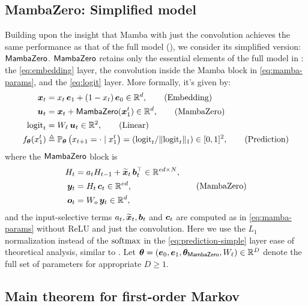 \subsection{MambaZero: Simplified model}
\label{sec:mambazero}
Building upon the insight that Mamba with just the convolution achieves the same performance as that of the full model (), we consider its simplified version: $\mathsf{MambaZero}$.  $\mathsf{MambaZero}$ retains only the essential elements of the full model in : the \ref{eq:embedding} layer, the convolution inside the Mamba block in \ref{eq:mamba-params}, and the \ref{eq:logit} layer. More formally, it's given by:
\begin{align}
\boldsymbol{x}_t &= x_t \, \boldsymbol{e}_1 + (1-x_t) \, \boldsymbol{e}_0 \in \mathbb{R}^d, \tag{Embedding}  \label{eq:embedding-simple}  \\
\boldsymbol{u}_t &= \boldsymbol{x}_t + \mathsf{MambaZero}(\boldsymbol{x}_1^t) \in \mathbb{R}^d, \tag{MambaZero}  \label{eq:mamba-simple} \\
\mathrm{logit}_t &= W_{\ell} \, {\boldsymbol{u}_t} \in \mathbb{R}^{2}, \tag{Linear} \label{eq:logit-simple} \\
f_{\boldsymbol{\theta}}(x_1^t) & \triangleq \mathbb{P}_{\boldsymbol{\theta}}\left( x_{t+1} = \cdot \mid x_1^t \right) = \left(  \mathrm{logit}_t/\|\mathrm{logit}_t\|_1 \right) \in [0,1]^2, \tag{Prediction}    \label{eq:prediction-simple}
\end{align}
where the $\mathsf{MambaZero}$ block is
\begin{equation}
\begin{split}
H_t &= a_t H_{t-1} + \widetilde{\boldsymbol{x}}_t \, \boldsymbol{b}_t^\top \in \mathbb{R}^{e d \times N}, \\
\boldsymbol{y}_t &= H_t\, \boldsymbol{c}_t  \in \mathbb{R}^{ed}, \\
\boldsymbol{o}_t &= W_o\, \boldsymbol{y}_t \in \mathbb{R}^{d},
\end{split}
\tag{MambaZero}
\label{eq:mamba-eqs-simple}
\end{equation}
and the input-selective terms  $a_t, \widetilde{\boldsymbol{x}}_t, \boldsymbol{b}_t$ and $\boldsymbol{c}_t$ are computed as in \ref{eq:mamba-params} without ReLU and just the convolution. Here we use the $L_1$ normalization instead of the $\mathrm{softmax}$ in the \ref{eq:prediction-simple} layer ease of theoretical analysis, similar to \cite{nic2024trans,rajaraman2024transformersmarkovdataconstant}. Let $\boldsymbol{\theta}= (\boldsymbol{e}_0, \boldsymbol{e}_1, \boldsymbol{\theta}_{\mathsf{MambaZero}} ,  W_\ell) \in \mathbb{R}^{D} $ denote the full set of parameters for appropriate $D \geq 1$. 

\subsection{Main theorem for first-order Markov}
\label{sec:main_thm}

